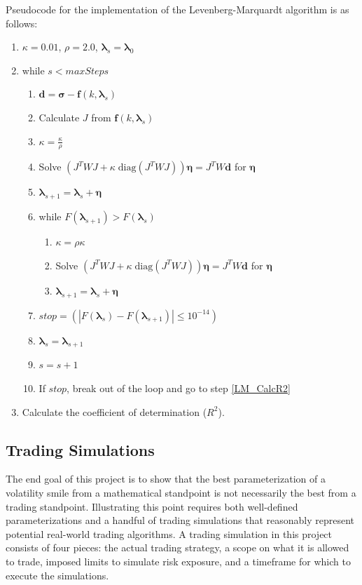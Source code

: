 \documentclass[12pt, a4paper, notitlepage]{article}
\numberwithin{equation}{subsection}
\numberwithin{figure}{subsection}
\numberwithin{table}{subsection}
\newcommand{\lambdaVect}{\pmb{\lambda}}
\begin{document}
Pseudocode for the implementation of the Levenberg-Marquardt algorithm is as follows:

\begin{enumerate}
	\item $\kappa = 0.01$, $\rho = 2.0$, $\lambdaVect_s = \lambdaVect_0$
	\item while $s < maxSteps$
    	\begin{enumerate}
        	\item $\pmb{d} = \pmb{\sigma} - \pmb{f}(k, \pmb{\lambda}_{s})$
            \item Calculate $J$ from $\pmb{f}(k, \pmb{\lambda}_{s})$
            \item $\kappa = \frac{\kappa}{\rho}$
            \item Solve $\left(J^{T} W J + \kappa \; \text{diag}(J^{T} W J)\right) \pmb{\eta} = J^{T} W \pmb{d}$ for $\pmb{\eta}$
            \item $\lambdaVect_{s+1} = \pmb{\lambda}_{s} + \pmb{\eta}$
            \item while $F(\lambdaVect_{s+1}) > F(\pmb{\lambda}_{s})$
                    \begin{enumerate}
                        \item $\kappa = \rho \kappa$              
                        \item Solve $\left(J^{T} W J + \kappa \; \text{diag}(J^{T} W J)\right) \pmb{\eta} = J^{T} W \pmb{d}$ for $\pmb{\eta}$
                        \item $\lambdaVect_{s+1} = \pmb{\lambda}_{s} + \pmb{\eta}$
                    \end{enumerate}
            \item $stop = (|F(\lambdaVect_{s}) - F(\lambdaVect_{s+1})| \leq 10^{-14})$
            \item $\pmb{\lambda}_{s} = \lambdaVect_{s+1}$
            \item $s = s + 1$
            \item If $stop$, break out of the loop and go to step \ref{LM_CalcR2}
    	\end{enumerate}
   \item Calculate the coefficient of determination ($R^2$). \label{LM_CalcR2}
\end{enumerate}

\subsection{Trading Simulations}\label{sec:TradingStrategies}
The end goal of this project is to show that the best parameterization of a volatility smile from a mathematical standpoint is not necessarily the best from a trading standpoint.  Illustrating this point requires both well-defined parameterizations and a handful of trading simulations that reasonably represent potential real-world trading algorithms.  A trading simulation in this project consists of four pieces: the actual trading strategy, a scope on what it is allowed to trade, imposed limits to simulate risk exposure, and a timeframe for which to execute the simulations.
\end{document}
